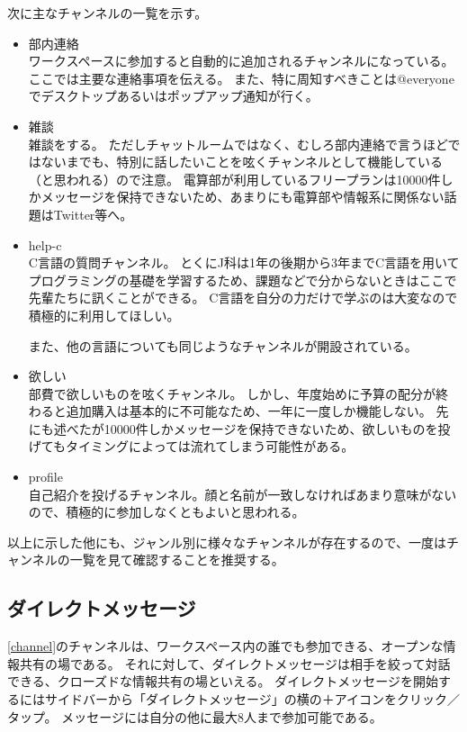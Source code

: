 \documentclass[lualatex,ja=standard,12pt,a4j]{bxjsbook}
\begin{document}
            	次に主なチャンネルの一覧を示す。
            
            	\begin{itemize}
            		\item 部内連絡\\
                        ワークスペースに参加すると自動的に追加されるチャンネルになっている。
                        ここでは主要な連絡事項を伝える。
                        また、特に周知すべきことは@everyoneでデスクトップあるいはポップアップ通知が行く。
                	\item 雑談\\
                    	雑談をする。
                        ただしチャットルームではなく、むしろ部内連絡で言うほどではないまでも、特別に話したいことを呟くチャンネルとして機能している（と思われる）ので注意。
                        電算部が利用しているフリープランは10000件しかメッセージを保持できないため、あまりにも電算部や情報系に関係ない話題はTwitter等へ。
                    \item help-c\\
                    	C言語の質問チャンネル。
                        とくにJ科は1年の後期から3年までC言語を用いてプログラミングの基礎を学習するため、課題などで分からないときはここで先輩たちに訊くことができる。
                        C言語を自分の力だけで学ぶのは大変なので積極的に利用してほしい。
                        
                        また、他の言語についても同じようなチャンネルが開設されている。
                    \item 欲しい\\
                    	部費で欲しいものを呟くチャンネル。
                        しかし、年度始めに予算の配分が終わると追加購入は基本的に不可能なため、一年に一度しか機能しない。
                        先にも述べたが10000件しかメッセージを保持できないため、欲しいものを投げてもタイミングによっては流れてしまう可能性がある。
                    \item profile\\
                    	自己紹介を投げるチャンネル。顔と名前が一致しなければあまり意味がないので、積極的に参加しなくともよいと思われる。
            	\end{itemize}
            
            	以上に示した他にも、ジャンル別に様々なチャンネルが存在するので、一度はチャンネルの一覧を見て確認することを推奨する。
                
   			\subsection{ダイレクトメッセージ\label{directmessage}}
            	\ref{channel}のチャンネルは、ワークスペース内の誰でも参加できる、オープンな情報共有の場である。
                それに対して、ダイレクトメッセージは相手を絞って対話できる、クローズドな情報共有の場といえる。
                ダイレクトメッセージを開始するにはサイドバーから「ダイレクトメッセージ」の横の＋アイコンをクリック／タップ。
                メッセージには自分の他に最大8人まで参加可能である。
            
\end{document}
